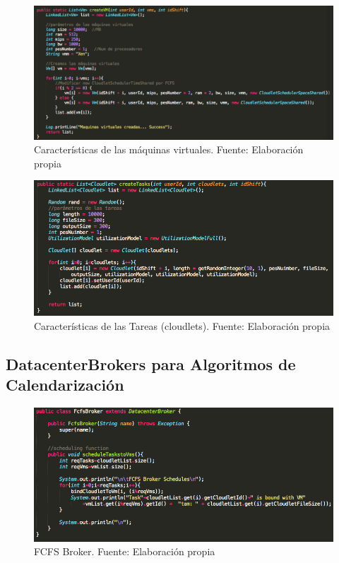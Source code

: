 \begin{figure}
	\caption{Características de las máquinas virtuales. Fuente: Elaboración propia}
	\centering
	\includegraphics[scale=0.3]{media/creacion_vm}
\end{figure}

\begin{figure}
	\caption{Características de las Tareas (cloudlets). Fuente: Elaboración propia}
	\centering
	\includegraphics[scale=0.5]{media/creacion_cloudlet}
\end{figure}

\subsection*{DatacenterBrokers para Algoritmos de Calendarización}

\begin{figure}
	\caption{FCFS Broker. Fuente: Elaboración propia}
	\centering
	\includegraphics[scale=0.5]{media/FCFS_broker}
\end{figure}

